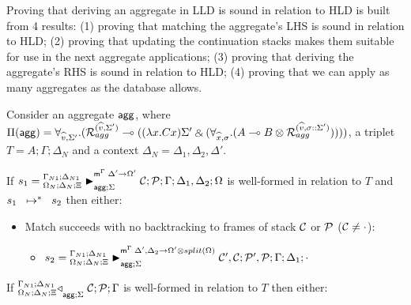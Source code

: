 
Proving that deriving an aggregate in LLD is sound in relation to HLD is built
from 4 results: (1) proving that matching the aggregate's LHS is sound in
relation to HLD; (2) proving that updating the continuation stacks makes them
suitable for use in the next aggregate applications; (3) proving that deriving
the aggregate's RHS is sound in relation to HLD; (4) proving that we can
apply as many aggregates as the database allows.

\begin{lemma}\label{thm:aggregate_body_match}
Consider an aggregate $\m{agg}$, where $\Pi(\m{agg}) = \forall_{\widehat{v}, \Sigma'}.
   (\defstwo{agg}{\widehat{v}}{\Sigma'} \lolli ((\lambda x. C x)\Sigma' \with (\forall_{\widehat{x}, \sigma}.
                                                (A \lolli B \otimes
                                                 \defstwo{agg}{\widehat{v}}{\sigma
                                                 ::\Sigma'}))))$,
a triplet $T = A; \Gamma; \Delta_{N}$ and a context $\Delta_{N} = \Delta_1,
  \Delta_2, \Delta'$.

  If $s_1 = \matstatea{\Delta_N}{\lstack{C};
      \lstack{P}}{\Gamma}{\Delta_1, \Delta_2}{\Omega}{\Delta' \rightarrow
         \Omega'}{\Sigma}$ is well-formed in relation to $T$ and
         $\transs{s_1}{s_2}$ then either:

\begin{itemize}[leftmargin=*]
   \item Match succeeds with no backtracking to frames of stack $\lstack{C}$
   or $\lstack{P}$ ($\lstack{C} \neq \cdot$):

   \begin{itemize}[leftmargin=\secondm]
      \item $s_2 = \matstatea{\Delta_N}{\lstack{C'}, \lstack{C}; \lstack{P'},
         \lstack{P}}{\Gamma}{\Delta_1}{\cdot}{\Delta', \Delta_2 \rightarrow \Omega' \otimes split(\Omega)}{\Sigma}$
   \end{itemize}

   

\end{itemize}

If $\contstatea{\Delta_N}{\lstack{C}; \lstack{P}}{\Gamma}{\Sigma}$ is
well-formed in relation to $T$ then either:

\begin{itemize}[leftmargin=*]
   
\end{itemize}
\end{lemma}


